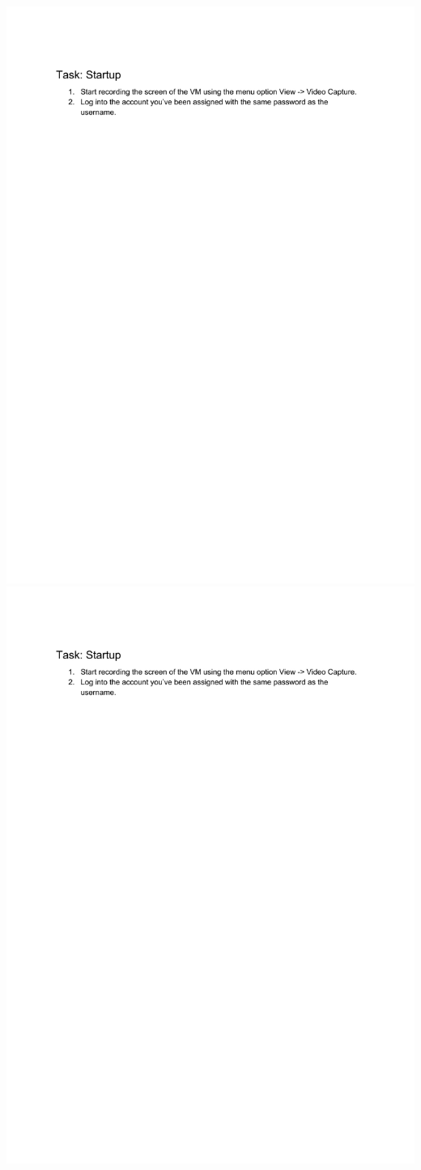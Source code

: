 \begin{adjustwidth}[]{0cm}{0cm}
\includegraphics[width=.5\textwidth,page=5,frame]{include/backmatter/tasks.pdf}
\includegraphics[width=.5\textwidth,page=6,frame]{include/backmatter/tasks.pdf}
\end{adjustwidth}
